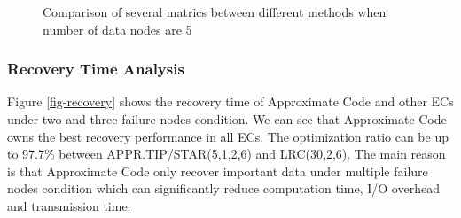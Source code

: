 \documentclass[sigconf]{acmart}
\begin{document}
\begin{figure}[!ht]
    \caption{Comparison of several matrics between different methods when number of data nodes are 5}\label{fig-BAR}
    \end{figure}

\subsubsection{Recovery Time Analysis}

Figure \ref{fig-recovery} shows the recovery time of Approximate Code and other ECs under two and three failure nodes
condition. We can see that Approximate Code owns the best recovery performance in all ECs. The optimization ratio can be up to 97.7\% between APPR.TIP/STAR(5,1,2,6) and LRC(30,2,6). The main reason is that Approximate Code only recover important data under multiple failure nodes condition which can significantly reduce computation time, I/O overhead and transmission time.
\end{document}
